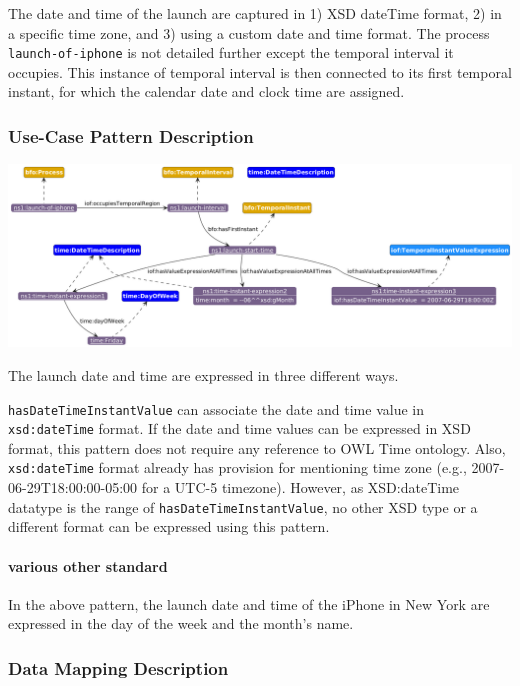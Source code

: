 The date and time of the launch are captured in 1) XSD dateTime format, 2) in a specific time zone, and 3) using a custom date and time format. The process \texttt{launch-of-iphone} is not detailed further except the temporal interval it occupies. This instance of temporal interval is then connected to its first temporal instant, for which the calendar date and clock time are assigned.   

\subsubsection*{Use-Case Pattern Description}

\includegraphics[scale=0.35]{scenarios/clock-time-calendar-date/images/uc1-dow-mn.png}

The launch date and time are expressed in three different ways.  

\texttt{hasDateTimeInstantValue} can associate the date and time value in \texttt{xsd:dateTime} format. If the date and time values can be expressed in XSD format, this pattern does not require any reference to OWL Time ontology. Also, \texttt{xsd:dateTime} format already has provision for mentioning time zone (e.g., 2007-06-29T18:00:00-05:00 for a UTC-5 timezone). However, as XSD:dateTime datatype is the range of \texttt{hasDateTimeInstantValue}, no other XSD type or a different format can be expressed using this pattern. 

\paragraph{various other standard \\}

In the above pattern, the launch date and time of the iPhone in New York are expressed in the day of the week and the month's name.     



\subsubsection*{Data Mapping Description}

